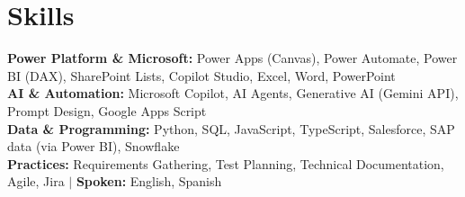 \documentclass[letterpaper,11pt]{article}
\begin{document}
\section{Skills}
 \begin{itemize}[leftmargin=0.15in, label={}]
    \small{\item{
     \textbf{Power Platform \& Microsoft:} Power Apps (Canvas), Power Automate, Power BI (DAX), SharePoint Lists, Copilot Studio, Excel, Word, PowerPoint \\
     \textbf{AI \& Automation:} Microsoft Copilot, AI Agents, Generative AI (Gemini API), Prompt Design, Google Apps Script \\
     \textbf{Data \& Programming:} Python, SQL, JavaScript, TypeScript, Salesforce, SAP data (via Power BI), Snowflake \\
     \textbf{Practices:} Requirements Gathering, Test Planning, Technical Documentation, Agile, Jira $|$ \textbf{Spoken:} English, Spanish
    }}
 \end{itemize}
\end{document}
